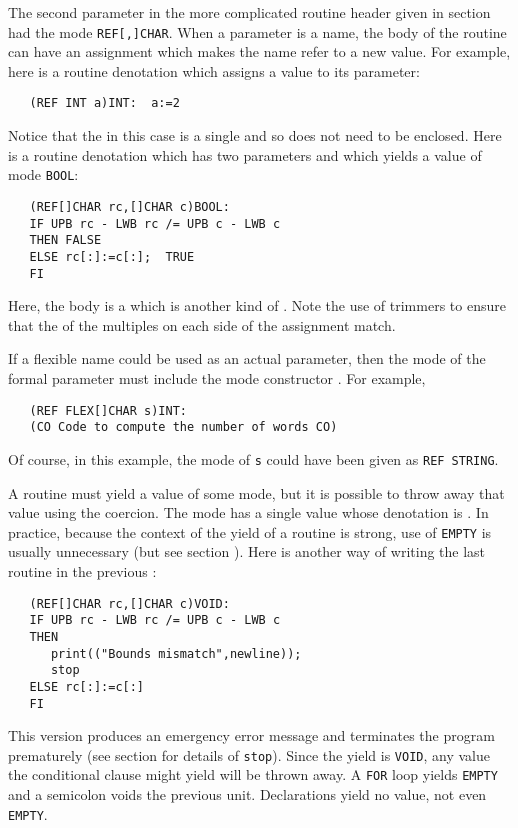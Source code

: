 The second parameter in the more complicated routine header given in
section  had the mode \verb|REF[,]CHAR|. When a
parameter is a name, the body of the routine can have an assignment
which makes the name refer to a new value. For example, here is a
routine denotation which assigns a value to its parameter:
\begin{verbatim}
   (REF INT a)INT:  a:=2
\end{verbatim}
\noindent
Notice that the  in this case is a single  and so
does not need to be enclosed. Here is a routine denotation which
has two parameters and which yields a value of mode \verb|BOOL|:
\begin{verbatim}
   (REF[]CHAR rc,[]CHAR c)BOOL:
   IF UPB rc - LWB rc /= UPB c - LWB c
   THEN FALSE
   ELSE rc[:]:=c[:];  TRUE
   FI
\end{verbatim}
\noindent
Here, the body is a 
which is another kind of . Note
the use of trimmers to ensure that the  of the multiples
on each side of the assignment match.

If a flexible name could be used as an actual parameter, then
the mode of the formal parameter must include the mode constructor
. For example,
\begin{verbatim}
   (REF FLEX[]CHAR s)INT:
   (CO Code to compute the number of words CO)
\end{verbatim}
\noindent
Of course, in this example, the mode of \verb|s| could have been
given as \verb|REF STRING|.

A routine must yield a value of some mode, but it is possible to
throw away that value using the 
coercion. The mode  has a single value whose denotation is
. In practice, because the context of the yield of a
routine is strong, use of \verb|EMPTY| is usually unnecessary (but
see section ). Here is another way of writing the
last routine in the previous :
\begin{verbatim}
   (REF[]CHAR rc,[]CHAR c)VOID:
   IF UPB rc - LWB rc /= UPB c - LWB c
   THEN
      print(("Bounds mismatch",newline));
      stop
   ELSE rc[:]:=c[:]
   FI
\end{verbatim}
\noindent
This version produces an emergency error message and terminates the
program prematurely (see section  for details of
\verb|stop|).  Since the yield is \verb|VOID|, any value the
conditional clause might yield will be thrown away. A \verb|FOR| loop
yields \verb|EMPTY| and a semicolon voids the previous unit.
Declarations yield no value, not even \verb|EMPTY|.

